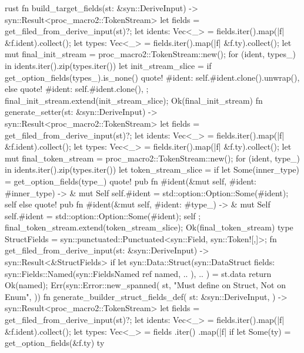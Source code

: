 \begin{code-block}{rust}
fn build_target_fields(st: &syn::DeriveInput) -> syn::Result<proc_macro2::TokenStream> {
    let fields = get_filed_from_derive_input(st)?;
    let idents: Vec<_> = fields.iter().map(|f| &f.ident).collect();
    let types: Vec<_> = fields.iter().map(|f| &f.ty).collect();
    let mut final_init_stream = proc_macro2::TokenStream::new();
    for (ident, types_) in idents.iter().zip(types.iter()) {
        let init_stream_slice = if get_option_fields(types_).is_none() {
            quote! {
                #ident: self.#ident.clone().unwrap(),
            }
        } else {
            quote! {
                #ident: self.#ident.clone(),
            }
        };
        final_init_stream.extend(init_stream_slice);
    }
    Ok(final_init_stream)
}
fn generate_setter(st: &syn::DeriveInput) -> syn::Result<proc_macro2::TokenStream> {
    let fields = get_filed_from_derive_input(st)?;
    let idents: Vec<_> = fields.iter().map(|f| &f.ident).collect();
    let types: Vec<_> = fields.iter().map(|f| &f.ty).collect();
    let mut final_token_stream = proc_macro2::TokenStream::new();
    for (ident, type_) in idents.iter().zip(types.iter()) {
        let token_stream_slice = if let Some(inner_type) = get_option_fields(type_) {
            quote! {
                pub fn #ident(&mut self, #ident: #inner_type) -> & mut Self {
                    self.#ident = std::option::Option::Some(#ident);
                    self
                }
            }
        } else {
            quote! {
                pub fn #ident(&mut self, #ident: #type_) -> & mut Self {
                    self.#ident = std::option::Option::Some(#ident);
                    self
                }
            }
        };
        final_token_stream.extend(token_stream_slice);
    }
    Ok(final_token_stream)
}
type StructFields = syn::punctuated::Punctuated<syn::Field, syn::Token![,]>;
fn get_filed_from_derive_input(st: &syn::DeriveInput) -> syn::Result<&StructFields> {
    if let syn::Data::Struct(syn::DataStruct {
        fields: syn::Fields::Named(syn::FieldsNamed { ref named, .. }),
        ..
    }) = st.data
    {
        return Ok(named);
    }
    Err(syn::Error::new_spanned(
        st,
        "Must define on Struct, Not on Enum",
    ))
}
fn generate_builder_struct_fields_def(
    st: &syn::DeriveInput,
) -> syn::Result<proc_macro2::TokenStream> {
    let fields = get_filed_from_derive_input(st)?;
    let idents: Vec<_> = fields.iter().map(|f| &f.ident).collect();
    let types: Vec<_> = fields
        .iter()
        .map(|f| {
            if let Some(ty) = get_option_fields(&f.ty) {
                ty
}}}
\end{code-block}
